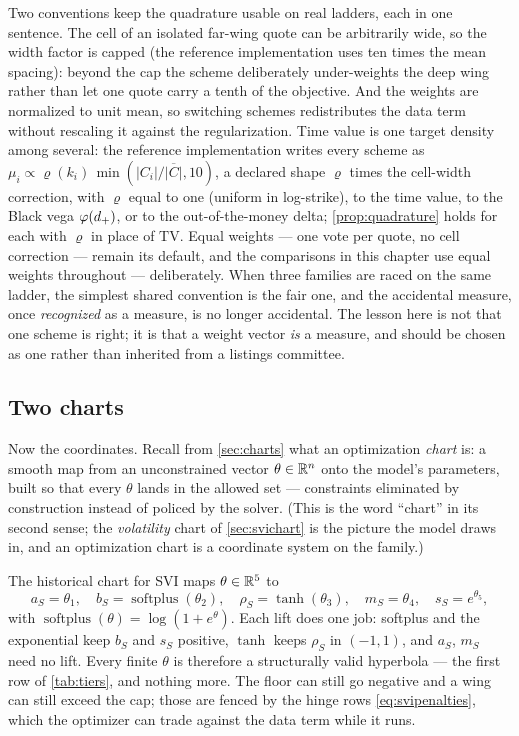 Two conventions keep the quadrature usable on real ladders, each in one
sentence.  The cell of an isolated far-wing quote can be arbitrarily
wide, so the width factor is capped (the reference implementation uses
ten times the mean spacing): beyond the cap the scheme deliberately
under-weights the deep wing rather than let one quote carry a tenth of
the objective.  And the weights are normalized to unit mean, so
switching schemes redistributes the data term without rescaling it
against the regularization.  Time value is one target density among
several: the reference implementation writes every scheme as
$\mu_i\propto\varrho(k_i)\,\min(|C_i|/\overline{|C|},10)$, a declared
shape $\varrho$ times the cell-width correction, with $\varrho$ equal
to one (uniform in log-strike), to the time value, to the Black vega
$\varphi(d_+)$, or to the out-of-the-money delta; \cref{prop:quadrature}
holds for each with $\varrho$ in place of $\mathrm{TV}$.  Equal
weights --- one vote per quote, no cell correction --- remain its
default, and the comparisons in
this chapter use equal weights throughout --- deliberately.
When three families are raced on the same ladder, the simplest shared
convention is the fair one, and the accidental measure, once
\emph{recognized} as a measure, is no longer accidental.  The lesson
here is not that one scheme is right; it is that a weight vector
\emph{is} a measure, and should be chosen as one rather than inherited
from a listings committee.

\subsection{Two charts}
\label{sec:svistructural}

Now the coordinates.  Recall from \cref{sec:charts} what an
optimization \emph{chart} is: a smooth map from an unconstrained vector
$\theta\in\mathbb{R}^n$ onto the model's parameters, built so that every
$\theta$ lands in the allowed set --- constraints eliminated by
construction instead of policed by the solver.  (This is the word
``chart'' in its second sense; the \emph{volatility} chart of
\cref{sec:svichart} is the picture the model draws in, and an
optimization chart is a coordinate system on the family.)

The historical chart for SVI maps $\theta\in\mathbb{R}^5$ to
\begin{equation}
a_S=\theta_1,\quad
b_S=\operatorname{softplus}(\theta_2),\quad
\rho_S=\tanh(\theta_3),\quad
m_S=\theta_4,\quad
s_S=e^{\theta_5},
\label{eq:rawlift}
\end{equation}
with $\operatorname{softplus}(\theta)=\log(1+e^{\theta})$.  Each lift
does one job: softplus and the exponential keep $b_S$ and $s_S$
positive, $\tanh$ keeps $\rho_S$ in $(-1,1)$, and $a_S$, $m_S$ need no
lift.  Every finite $\theta$ is therefore a structurally valid
hyperbola --- the first row of \cref{tab:tiers}, and nothing more.  The
floor can still go negative and a wing can still exceed the cap; those
are fenced by the hinge rows \eqref{eq:svipenalties}, which the
optimizer can trade against the data term while it runs.


